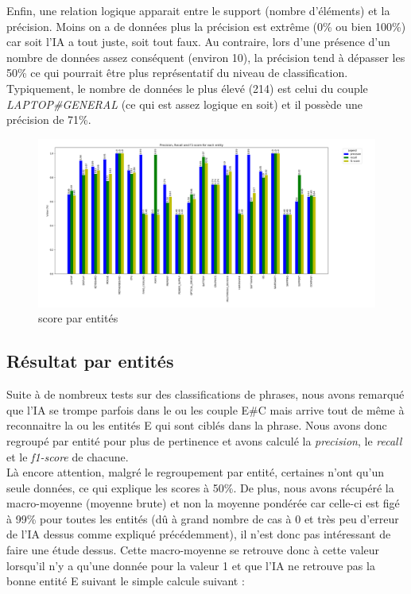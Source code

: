 \documentclass[12pt ,a4paper ]{article}
\begin{document}
\begin{multicols}{2}
Enfin, une relation logique apparait entre le support (nombre d'éléments) et la précision. Moins on a de données plus la précision est extrême (0\% ou bien 100\%) car soit l'IA a tout juste, soit tout faux. Au contraire, lors d'une présence d'un nombre de données assez conséquent (environ 10), la précision tend à dépasser les 50\% ce qui pourrait être plus représentatif du niveau de classification. Typiquement, le nombre de données le plus élevé (214) est celui du couple \textit{LAPTOP\#GENERAL} (ce qui est assez logique en soit) et il possède une précision de 71\%.

\begin{figure}[t]
    \begin{center}
        \includegraphics[width=1.15\textwidth]{entity_plot.png}
    \end{center}
    \caption{score par entités}
\end{figure}
\newpage
\subsection{Résultat par entités}
Suite à de nombreux tests sur des classifications de phrases, nous avons remarqué que l'IA se trompe parfois dans le ou les couple E\#C mais arrive tout de même à reconnaitre la ou les entités E qui sont ciblés dans la phrase. Nous avons donc regroupé par entité pour plus de pertinence et avons calculé la \textit{precision}, le \textit{recall} et le \textit{f1-score} de chacune.\\

Là encore attention, malgré le regroupement par entité, certaines n'ont qu'un seule données, ce qui explique les scores à 50\%. De plus, nous avons récupéré la macro-moyenne (moyenne brute) et non la moyenne pondérée car celle-ci est figé à 99\% pour toutes les entités (dû à grand nombre de cas à 0 et très peu d'erreur de l'IA dessus comme expliqué précédemment), il n'est donc pas intéressant de faire une étude dessus. Cette macro-moyenne se retrouve donc à cette valeur lorsqu'il n'y a qu'une donnée pour la valeur 1 et que l'IA ne retrouve pas la bonne entité E suivant le simple calcule suivant : 


\end{multicols}
\end{document}
